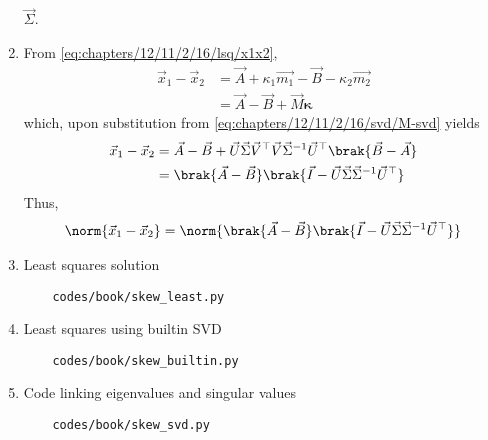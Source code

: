\begin{enumerate}[label=\thesubsection.\arabic*.,ref=\thesubsection.\theenumi]
    $\vec{\Sigma}$. 
		\item 
	    From \eqref{eq:chapters/12/11/2/16/lsq/x1x2}, 
\begin{align}
	\vec{x}_1-\vec{x}_2 &= 
	\vec{A}+ \kappa_1\vec{m_1}
	 -\vec{B}  - \kappa_2\vec{m_2} 
	 \\
	 &=
	\vec{A} 
	 -\vec{B}  + \vec{M} 
	\bm{\kappa}
\end{align}
which, upon substitution from 
        \eqref{eq:chapters/12/11/2/16/svd/M-svd}
	yields
\begin{align}
	\vec{x}_1-\vec{x}_2 &= 
	\vec{A} 
	 -\vec{B}  + 
\vec{U}\vec{\Sigma}\vec{V}^\top
\vec{V}\vec{\Sigma}^{-1}\vec{U}^\top\brak{\vec{B}-\vec{A}}
\\
	&=
	\brak{	\vec{A} 
	 -\vec{B}}  \brak{\vec{I}- 
\vec{U}\vec{\Sigma}
	\vec{\Sigma}^{-1}\vec{U}^\top}
\end{align}
			Thus, 
    \begin{align}
	    \norm{\vec{x}_1-\vec{x}_2} = 
	\norm{\brak{	\vec{A} 
	 -\vec{B}}  \brak{\vec{I}- 
\vec{U}\vec{\Sigma}
	    \vec{\Sigma}^{-1}\vec{U}^\top}}
        \label{eq:chapters/12/11/2/16/svd/min-sol}
    \end{align}
\item Least squares solution
	\begin{lstlisting}
	codes/book/skew_least.py
\end{lstlisting}
\item Least squares using builtin SVD 
	\begin{lstlisting}
	codes/book/skew_builtin.py
\end{lstlisting}
\item Code linking eigenvalues and singular values
	\begin{lstlisting}
	codes/book/skew_svd.py
\end{lstlisting}
\end{enumerate}
